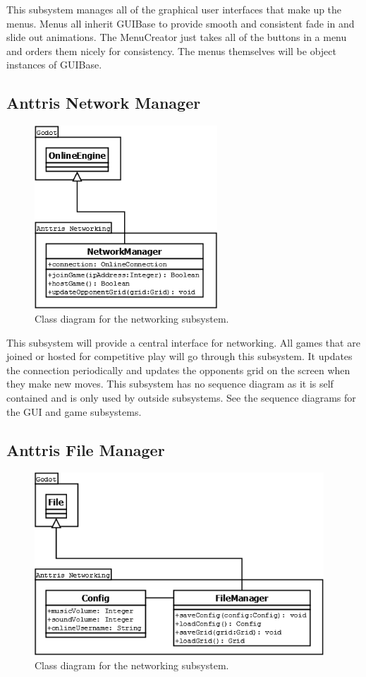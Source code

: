 \documentclass[12pt]{article}
\begin{document}
This subsystem manages all of the graphical user interfaces that make up the menus. Menus all inherit GUIBase to provide smooth and consistent fade in and slide out animations. The MenuCreator just takes all of the buttons in a menu and orders them nicely for consistency. The menus themselves will be object instances of GUIBase.

\subsection{Anttris Network Manager} %
    \begin{figure}[H]
        \centering
        \includegraphics[width=2.7in]{Anttris_NetworkingClass.png}
        \caption{Class diagram for the networking subsystem.}
    \end{figure}
    
This subsystem will provide a central interface for networking. All games that are joined or hosted for competitive play will go through this subsystem. It updates the connection periodically and updates the opponents grid on the screen when they make new moves. This subsystem has no sequence diagram as it is self contained and is only used by outside subsystems. See the sequence diagrams for the GUI and game subsystems.

\subsection{Anttris File Manager} %
    \begin{figure}[H]
        \centering
        \includegraphics[width=4.27in]{Anttris_FileClass.png}
        \caption{Class diagram for the networking subsystem.}
    \end{figure}
    
\end{document}
